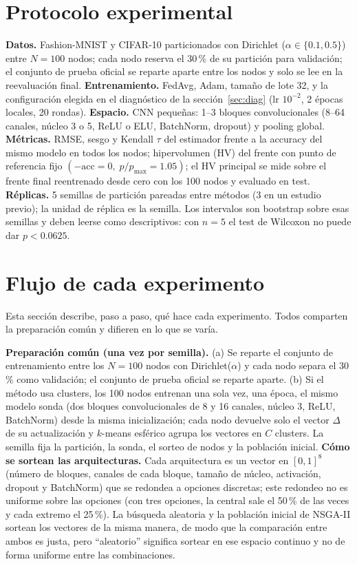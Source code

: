 \documentclass[11pt,a4paper]{article}
\newcommand{\acc}{\mathrm{acc}}
\begin{document}
\section{Protocolo experimental}
\textbf{Datos.} Fashion-MNIST y CIFAR-10 particionados con Dirichlet ($\alpha\in\{0.1,0.5\}$) entre $N=100$ nodos; cada nodo reserva el 30\,\% de su partición para validación; el conjunto de prueba oficial se reparte aparte entre los nodos y solo se lee en la reevaluación final. \textbf{Entrenamiento.} FedAvg, Adam, tamaño de lote 32, y la configuración elegida en el diagnóstico de la sección~\ref{sec:diag} (lr $10^{-2}$, 2 épocas locales, 20 rondas). \textbf{Espacio.} CNN pequeñas: 1--3 bloques convolucionales (8--64 canales, núcleo 3 o 5, ReLU o ELU, BatchNorm, dropout) y pooling global. \textbf{Métricas.} RMSE, sesgo y Kendall $\tau$ del estimador frente a la accuracy del mismo modelo en todos los nodos; hipervolumen (HV) del frente con punto de referencia fijo $(-\acc=0,\;p/p_{\max}=1.05)$; el HV principal se mide sobre el frente final reentrenado desde cero con los 100 nodos y evaluado en test. \textbf{Réplicas.} 5 semillas de partición pareadas entre métodos (3 en un estudio previo); la unidad de réplica es la semilla. Los intervalos son bootstrap sobre esas semillas y deben leerse como descriptivos: con $n=5$ el test de Wilcoxon no puede dar $p<0.0625$.

\section{Flujo de cada experimento}\label{sec:flujos}
Esta sección describe, paso a paso, qué hace cada experimento. Todos comparten la preparación común y difieren en lo que se varía.

\textbf{Preparación común (una vez por semilla).} (a) Se reparte el conjunto de entrenamiento entre los $N=100$ nodos con Dirichlet($\alpha$) y cada nodo separa el 30\,\% como validación; el conjunto de prueba oficial se reparte aparte. (b) Si el método usa clusters, los 100 nodos entrenan una sola vez, una época, el mismo modelo sonda (dos bloques convolucionales de 8 y 16 canales, núcleo 3, ReLU, BatchNorm) desde la misma inicialización; cada nodo devuelve solo el vector $\Delta$ de su actualización y $k$-means esférico agrupa los vectores en $C$ clusters. La semilla fija la partición, la sonda, el sorteo de nodos y la población inicial. \textbf{Cómo se sortean las arquitecturas.} Cada arquitectura es un vector en $[0,1]^{8}$ (número de bloques, canales de cada bloque, tamaño de núcleo, activación, dropout y BatchNorm) que se redondea a opciones discretas; este redondeo no es uniforme sobre las opciones (con tres opciones, la central sale el 50\,\% de las veces y cada extremo el 25\,\%). La búsqueda aleatoria y la población inicial de NSGA-II sortean los vectores de la misma manera, de modo que la comparación entre ambos es justa, pero ``aleatorio'' significa sortear en ese espacio continuo y no de forma uniforme entre las combinaciones.
\end{document}
